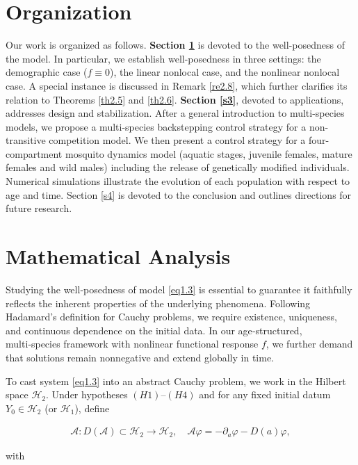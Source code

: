 \documentclass[10pt, a4paper]{amsart}
\theoremstyle{plain}
\theoremstyle{definition}
\theoremstyle{remark}
\numberwithin{equation}{section}
\begin{document}
\section*{\bf Organization}
Our work is organized as follows. {\bf Section \ref{s2}} is devoted to the well-posedness of the model. In particular, we establish well-posedness in three settings: the demographic case ($f\equiv 0$), the linear nonlocal case, and the nonlinear nonlocal case. A special instance is discussed in Remark \ref{re2.8}, which further clarifies its relation to Theorems \ref{th2.5} and \ref{th2.6}. {\bf Section \ref{s3}}, devoted to applications, addresses design and stabilization. After a general introduction to multi-species models, we propose a multi-species backstepping control strategy for a non-transitive competition model. We then present a control strategy for a four-compartment mosquito dynamics model (aquatic stages, juvenile females, mature females and wild males) including the release of genetically modified individuals. Numerical simulations illustrate the evolution of each population with respect to age and time. Section \ref{s4} is devoted to the conclusion and outlines directions for future research.

\section{\bf Mathematical Analysis}\label{s2}%
Studying the well‑posedness of model \eqref{eq1.3} is essential to guarantee it faithfully reflects the inherent properties of the underlying phenomena. Following Hadamard’s definition for Cauchy problems, we require existence, uniqueness, and continuous dependence on the initial data. In our age‑structured, multi‑species framework with nonlinear functional response $f$, we further demand that solutions remain nonnegative and extend globally in time.

To cast system \eqref{eq1.3} into an abstract Cauchy problem, we work in the Hilbert space $\mathcal H_2$. Under hypotheses $(H1)$–$(H4)$ and for any fixed initial datum $Y_0\in\mathcal H_2$ (or $\mathcal H_1$), define

\begin{align}\label{op1}
 \mathcal A : D(\mathcal A)\subset\mathcal H_2\longrightarrow\mathcal H_2,
   \quad \mathcal A\varphi=-\partial_a\varphi - D(a)\varphi,
\end{align}

with
\end{document}
